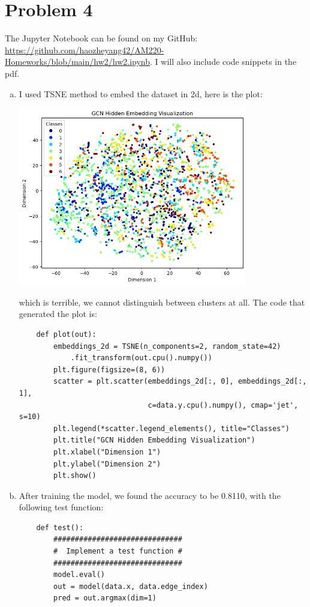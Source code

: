\documentclass[11pt]{scrartcl}
\begin{document}
\newpage

\section{Problem 4}

The Jupyter Notebook can be found on my GitHub: \href{https://github.com/haozheyang42/AM220-Homeworks/blob/main/hw2/hw2.ipynb}{https://github.com/haozheyang42/AM220-Homeworks/blob/main/hw2/hw2.ipynb}. I will also include code snippets in the pdf.

\begin{enumerate}[(a)]
    \item I used TSNE method to embed the dataset in 2d, here is the plot: \begin{center}
        \includegraphics[width=10cm]{hw2-img/hw2-p4-a.png}
    \end{center}
    which is terrible, we cannot distinguish between clusters at all. The code that generated the plot is: \begin{verbatim}
    def plot(out):
        embeddings_2d = TSNE(n_components=2, random_state=42)
            .fit_transform(out.cpu().numpy())
        plt.figure(figsize=(8, 6))
        scatter = plt.scatter(embeddings_2d[:, 0], embeddings_2d[:, 1],
                              c=data.y.cpu().numpy(), cmap='jet', s=10)
        plt.legend(*scatter.legend_elements(), title="Classes")
        plt.title("GCN Hidden Embedding Visualization")
        plt.xlabel("Dimension 1")
        plt.ylabel("Dimension 2")
        plt.show()
    \end{verbatim}
    \item After training the model, we found the accuracy to be 0.8110, with the following test function: \begin{verbatim}
    def test():
        ##############################
        #  Implement a test function #
        ##############################
        model.eval()
        out = model(data.x, data.edge_index)
        pred = out.argmax(dim=1)
        

\end{verbatim}
\end{enumerate}
\end{document}
